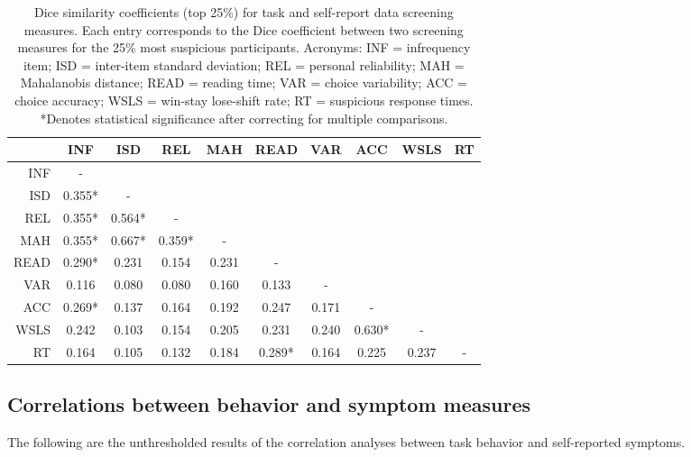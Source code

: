 \documentclass[a4paper,notitlepage,12pt]{article}
\begin{document}
\begin{table}[h!]
\centering
\small
\begin{tabular}{rccccccccc}
\toprule
{} &     INF &     ISD &     REL &    MAH &    READ &    VAR &     ACC &   WSLS & RT \\
\midrule
INF  &       - &         &         &        &         &        &         &        &    \\
ISD  &  0.355* &       - &         &        &         &        &         &        &    \\
REL  &  0.355* &  0.564* &       - &        &         &        &         &        &    \\
MAH  &  0.355* &  0.667* &  0.359* &      - &         &        &         &        &    \\
READ &  0.290* &   0.231 &   0.154 &  0.231 &       - &        &         &        &    \\
VAR  &   0.116 &   0.080 &   0.080 &  0.160 &   0.133 &      - &         &        &    \\
ACC  &  0.269* &   0.137 &   0.164 &  0.192 &   0.247 &  0.171 &       - &        &    \\
WSLS &   0.242 &   0.103 &   0.154 &  0.205 &   0.231 &  0.240 &  0.630* &      - &    \\
RT   &   0.164 &   0.105 &   0.132 &  0.184 &  0.289* &  0.164 &   0.225 &  0.237 &  - \\
\bottomrule
\end{tabular}
\captionsetup{width=0.88\textwidth}
\caption{Dice similarity coefficients (top 25\%) for task and self-report data screening measures. Each entry corresponds to the Dice coefficient between two screening measures for the 25\% most suspicious participants. Acronyms: INF = infrequency item; ISD = inter-item standard deviation; REL = personal reliability; MAH = Mahalanobis distance; READ = reading time; VAR = choice variability; ACC = choice accuracy; WSLS = win-stay lose-shift rate; RT = suspicious response times. *Denotes statistical significance after correcting for multiple comparisons.}
\end{table}

\subsection*{Correlations between behavior and symptom measures}

The following are the unthresholded results of the correlation analyses between task behavior and self-reported symptoms.  
\end{document}
